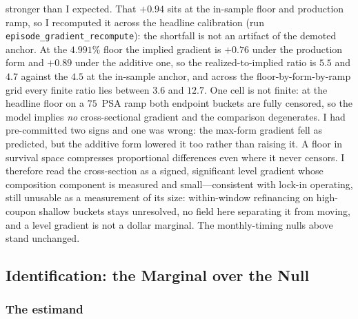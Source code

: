 \documentclass[12pt]{article}
\begin{document}
stronger than I expected. That $+0.94$ sits at the in-sample floor and production ramp, so I recomputed it across the headline calibration (run \texttt{episode\_gradient\_recompute}): the shortfall is not an artifact of the demoted anchor. At the $4.991\%$ floor the implied gradient is $+0.76$ under the production form and $+0.89$ under the additive one, so the realized-to-implied ratio is $5.5$ and $4.7$ against the $4.5$ at the in-sample anchor, and across the floor-by-form-by-ramp grid every finite ratio lies between $3.6$ and $12.7$. One cell is not finite: at the headline floor on a $75$~PSA ramp both endpoint buckets are fully censored, so the model implies \emph{no} cross-sectional gradient and the comparison degenerates. I had pre-committed two signs and one was wrong: the max-form gradient fell as predicted, but the additive form lowered it too rather than raising it. A floor in survival space compresses proportional differences even where it never censors. I therefore read the cross-section as a signed, significant level gradient whose composition component is measured and small---consistent with lock-in operating, still unusable as a measurement of its size: within-window refinancing on high-coupon shallow buckets stays unresolved, no field here separating it from moving, and a level gradient is not a dollar marginal. The monthly-timing nulls above stand unchanged.
\subsection{Identification: the Marginal over the Null}\label{sec:identification}

\subsubsection{The estimand}
\end{document}
